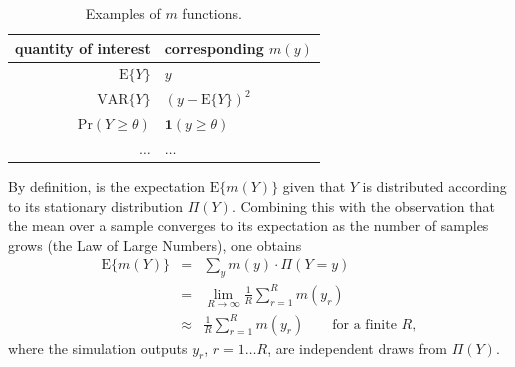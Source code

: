 \begin{center}
\begin{table}[H]
\caption{\label{tab:Examples-of-m}Examples of $m$ functions.}


\centering{}%
\begin{tabular}{r|l}
\hline 
quantity of interest & corresponding $m(y)$ \tabularnewline
\hline 
$\text{E}\{Y\}$ & $y$\tabularnewline
$\text{VAR}\{Y\}$ & $(y-\text{E}\{Y\})^{2}$\tabularnewline
$\text{Pr}(Y\geq\theta)$ & $\mathbf{1}(y\geq\theta)$\tabularnewline
$\ldots$ & $\ldots$\tabularnewline
\hline 
\end{tabular}
\end{table}

\par\end{center}

By definition,  is the expectation $\text{E}\{m(Y)\}$
given that $Y$ is distributed according to its stationary distribution
$\Pi(Y)$. Combining this with the observation that the mean over
a sample converges to its expectation as the number of samples grows
(the Law of Large Numbers), one obtains
\begin{eqnarray}
\text{E}\{m(Y)\} 
& = & 
\sum_{y}m(y)\cdot\Pi(Y=y)\label{eq:define-question}\\
 & = & 
 \lim_{R\rightarrow\infty}\frac{1}{R}\sum_{r=1}^{R}m(y_{r})\\
 & \approx & 
 \frac{1}{R}\sum_{r=1}^{R}m(y_{r})\qquad\text{for a finite }R,\label{eq:approximate-answer}
\end{eqnarray}
where the simulation outputs $y_{r}$, $r=1\ldots R$, are independent
draws from $\Pi(Y)$.

